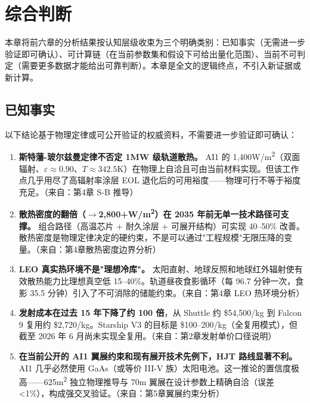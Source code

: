 
\section{综合判断}

本章将前六章的分析结果按认知层级收束为三个明确类别：已知事实（无需进一步验证即可确认）、可计算链（在当前参数集和假设下可给出量化范围）、当前不可判定（需要更多数据才能给出可靠判断）。本章是全文的逻辑终点，不引入新证据或新计算。

\subsection{已知事实}

以下结论基于物理定律或可公开验证的权威资料，不需要进一步验证即可确认：

\begin{enumerate}[leftmargin=*]
    \item \textbf{斯特藩-玻尔兹曼定律不否定 1\;MW 级轨道散热。} AI1 的 1,400\;W/m\textsuperscript{2}（双面辐射、$\varepsilon\approx0.90$、$T\approx342.5$\;K）在物理上自洽且可由当前材料实现。但该工作点几乎用尽了高辐射率涂层 EOL 退化后的可用裕度——物理可行不等于裕度充足。（来自：第4章 S-B 推导）

    \item \textbf{散热密度的翻倍（$\to$2,800+\;W/m\textsuperscript{2}）在 2035 年前无单一技术路径可支撑。} 组合路径（高温芯片 + 耐久涂层 + 可展开结构）可实现 40--50\% 改善。散热密度是物理定律决定的硬约束，不是可以通过"工程规模"无限压降的变量。（来自：第4章散热密度边界分析）

    \item \textbf{LEO 真实热环境不是"理想冷库"。} 太阳直射、地球反照和地球红外辐射使有效散热能力比理想真空低 15--40\%。轨道昼夜食影循环（每 96.7 分钟一次，食影 35.5 分钟）引入了不可消除的储能约束。（来自：第4章 LEO 热环境分析）

    \item \textbf{发射成本在过去 15 年下降了约 100 倍}，从 Shuttle 约 \$54,500/kg 到 Falcon 9 复用约 \$2,720/kg。Starship V3 的目标是 \$100--200/kg（全复用模式），但截至 2026 年 6 月尚未实现全复用\cite{nasalaunch2018,faa2025boca,faa2026ksc}。（来自：第2章发射单价口径说明）

    \item \textbf{在当前公开的 AI1 翼展约束和现有展开技术先例下，HJT 路线显著不利。} AI1 几乎必然使用 GaAs（或等价 III-V 族）太阳电池。这一推论的置信度极高——625\;m\textsuperscript{2} 独立物理推导与 70\;m 翼展在设计参数上精确自洽（误差 <1\%），构成强交叉验证。（来自：第5章翼展约束分析）
\end{enumerate}

